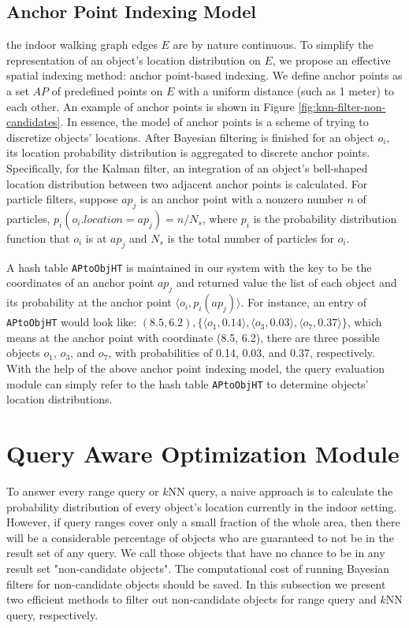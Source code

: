 \documentclass[12pt]{report}
\begin{document}
\section{Anchor Point Indexing Model}
\label{sec:org46e33c2}

the indoor walking graph edges \(E\) are by nature continuous.  To
simplify the representation of an object's location distribution
on \(E\), we propose an effective spatial indexing method: anchor
point-based indexing.  We define anchor points as a set \(AP\) of
predefined points on \(E\) with a uniform distance (such as 1
meter) to each other.  An example of anchor points is shown in
Figure \ref{fig:knn-filter-non-candidates}.  In essence, the model of
anchor points is a scheme of trying to discretize objects'
locations.  After Bayesian filtering is finished for an object
\(o_i\), its location probability distribution is aggregated to
discrete anchor points.  Specifically, for the Kalman filter, an
integration of an object's bell-shaped location distribution
between two adjacent anchor points is calculated. For particle
filters, suppose \(ap_j\) is an anchor point with a nonzero number
\(n\) of particles, \(p_i(o_i.location=ap_j)=n/N_s\), where
\(p_i\) is the probability distribution function that \(o_i\) is
at \(ap_j\) and \(N_s\) is the total number of particles for
\(o_i\).

A hash table \texttt{APtoObjHT} is maintained in our system with the key
to be the coordinates of an anchor point \(ap_j\) and returned
value the list of each object and its probability at the anchor
point \(\langle o_i, p_i(ap_j)\rangle\).  For instance, an entry
of \texttt{APtoObjHT} would look like: \((8.5, 6.2), \{\langle o_1,
    0.14\rangle, \langle o_3, 0.03\rangle, \langle o_7, 0.37\rangle
    \}\), which means at the anchor point with coordinate (8.5, 6.2),
there are three possible objects \(o_1\), \(o_3\), and \(o_7\),
with probabilities of 0.14, 0.03, and 0.37, respectively.  With
the help of the above anchor point indexing model, the query
evaluation module can simply refer to the hash table \texttt{APtoObjHT}
to determine objects' location distributions.

\chapter{Query Aware Optimization Module}
\label{sec:optimization-module}
To answer every range query or \(k\)NN query, a naive approach is
to calculate the probability distribution of every object's
location currently in the indoor setting.  However, if query ranges
cover only a small fraction of the whole area, then there will be a
considerable percentage of objects who are guaranteed to not be in
the result set of any query.  We call those objects that have no
chance to be in any result set "non-candidate objects".  The
computational cost of running Bayesian filters for non-candidate
objects should be saved.  In this subsection we present two
efficient methods to filter out non-candidate objects for range
query and \(k\)NN query, respectively.
\end{document}
